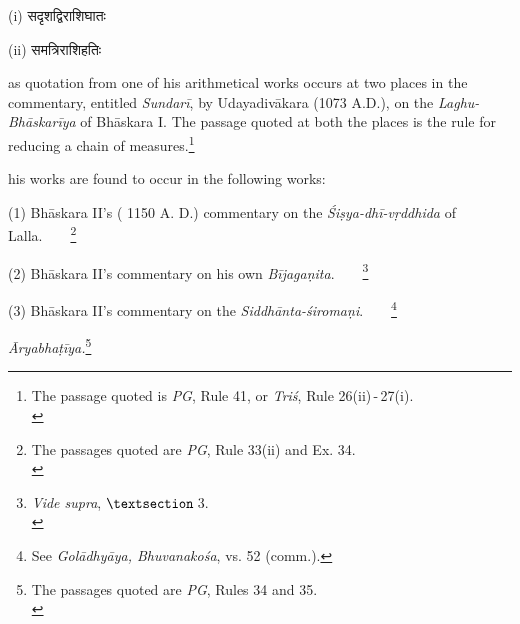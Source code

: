 \documentclass[10pt, openany]{book}
\begin{document}
\sanskritfont 
\hspace{6mm} {(i) सदृशद्विराशिघातः

\hspace{5.5mm} (ii) समत्रिराशिहतिः }
\vspace{3mm}

{as quotation from one of his arithmetical works occurs at}
{two places in the commentary, entitled \textit{Sundarī}, by Udayadivākara}
{(1073 A.D.), on the\textit{ Laghu-Bhāskarīya} of Bhāskara I.}
{The passage quoted at both the places is the rule for reducing}
{a chain of measures.\renewcommand{\thefootnote}{1}\footnote{\hspace{-2mm} \englishfont The passage quoted is \emph{PG}, Rule 41, or \emph{Triś}, Rule
26(ii)\,-\,27(i).\\}}

\vspace{0.3cm}{Other references to Śrīdharācārya or quotations from}
{his works are found to occur in the following works:}
\vspace{2mm}

{(1) Bhāskara II's ( 1150 A. D.) commentary on the \textit{Śiṣya-dhī-vṛddhida }of Lalla.~~~~\renewcommand{\thefootnote}{\hspace{-4.5mm} 2}\footnote{\hspace{-2mm} \englishfont The passages quoted are \textit{PG}, Rule 33(ii) and Ex. 34.\\}}
\vspace{2mm}

{(2) Bhāskara II's commentary on his own \textit{Bījagaṇita}.~~~~\renewcommand{\thefootnote}{\hspace{-4.5mm} 3}\footnote{\hspace{-2mm} \englishfont \emph{Vide supra}, $\textsection$\,3.\\}}
\vspace{2mm}

{(3) Bhāskara II's commentary on the \textit{Siddhānta-śiromaṇi}.~~~~\renewcommand{\thefootnote}{\hspace{-4.5mm} 4}\footnote{\hspace{-2mm} \englishfont See \textit{Golādhyāya, Bhuvanakośa}, vs. 52 (comm.).}}

\newpage

 \textit{Āryabhaṭīya.}\renewcommand{\thefootnote}{1}\footnote{\hspace{-2mm} \englishfont The passages quoted are \textit{PG}, Rules 34 and 35.\\}
\vspace{2mm}
\end{document}

